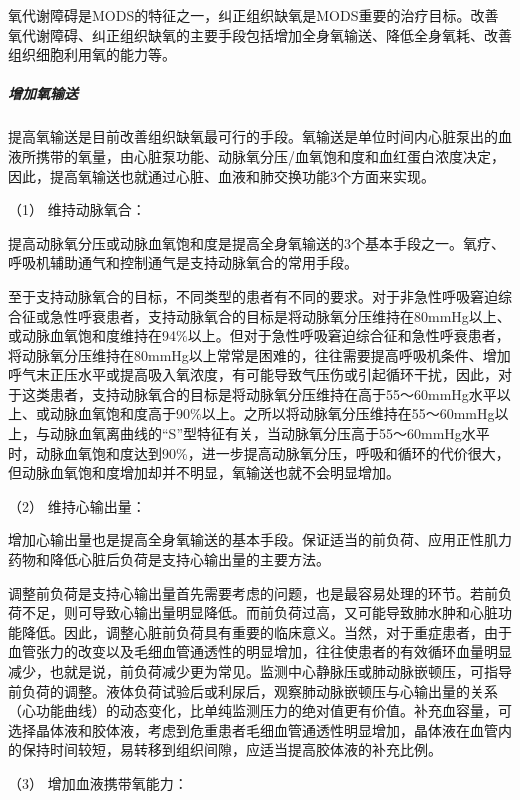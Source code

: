氧代谢障碍是MODS的特征之一，纠正组织缺氧是MODS重要的治疗目标。改善氧代谢障碍、纠正组织缺氧的主要手段包括增加全身氧输送、降低全身氧耗、改善组织细胞利用氧的能力等。

\subparagraph{增加氧输送}

提高氧输送是目前改善组织缺氧最可行的手段。氧输送是单位时间内心脏泵出的血液所携带的氧量，由心脏泵功能、动脉氧分压/血氧饱和度和血红蛋白浓度决定，因此，提高氧输送也就通过心脏、血液和肺交换功能3个方面来实现。

\hypertarget{text00095.htmlux5cux23CHP3-11-4-2-1-1}{}
（1） 维持动脉氧合：

提高动脉氧分压或动脉血氧饱和度是提高全身氧输送的3个基本手段之一。氧疗、呼吸机辅助通气和控制通气是支持动脉氧合的常用手段。

至于支持动脉氧合的目标，不同类型的患者有不同的要求。对于非急性呼吸窘迫综合征或急性呼衰患者，支持动脉氧合的目标是将动脉氧分压维持在80mmHg以上、或动脉血氧饱和度维持在94\%以上。但对于急性呼吸窘迫综合征和急性呼衰患者，将动脉氧分压维持在80mmHg以上常常是困难的，往往需要提高呼吸机条件、增加呼气末正压水平或提高吸入氧浓度，有可能导致气压伤或引起循环干扰，因此，对于这类患者，支持动脉氧合的目标是将动脉氧分压维持在高于55～60mmHg水平以上、或动脉血氧饱和度高于90\%以上。之所以将动脉氧分压维持在55～60mmHg以上，与动脉血氧离曲线的“S”型特征有关，当动脉氧分压高于55～60mmHg水平时，动脉血氧饱和度达到90\%，进一步提高动脉氧分压，呼吸和循环的代价很大，但动脉血氧饱和度增加却并不明显，氧输送也就不会明显增加。

\hypertarget{text00095.htmlux5cux23CHP3-11-4-2-1-2}{}
（2） 维持心输出量：

增加心输出量也是提高全身氧输送的基本手段。保证适当的前负荷、应用正性肌力药物和降低心脏后负荷是支持心输出量的主要方法。

调整前负荷是支持心输出量首先需要考虑的问题，也是最容易处理的环节。若前负荷不足，则可导致心输出量明显降低。而前负荷过高，又可能导致肺水肿和心脏功能降低。因此，调整心脏前负荷具有重要的临床意义。当然，对于重症患者，由于血管张力的改变以及毛细血管通透性的明显增加，往往使患者的有效循环血量明显减少，也就是说，前负荷减少更为常见。监测中心静脉压或肺动脉嵌顿压，可指导前负荷的调整。液体负荷试验后或利尿后，观察肺动脉嵌顿压与心输出量的关系（心功能曲线）的动态变化，比单纯监测压力的绝对值更有价值。补充血容量，可选择晶体液和胶体液，考虑到危重患者毛细血管通透性明显增加，晶体液在血管内的保持时间较短，易转移到组织间隙，应适当提高胶体液的补充比例。

\hypertarget{text00095.htmlux5cux23CHP3-11-4-2-1-3}{}
（3） 增加血液携带氧能力：

